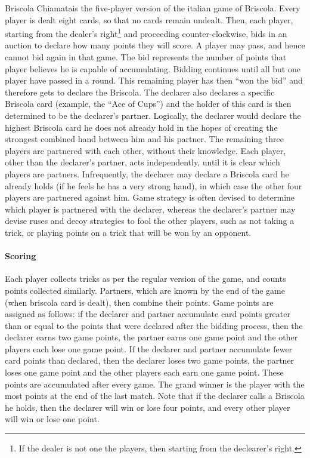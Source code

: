 \documentclass[a4paper]{article}
\begin{document}
Briscola Chiamatais the five-player version of the italian game of Briscola\cite{wiki:briscola}. Every player is dealt eight cards, so that no cards remain undealt. Then, each player, starting from the dealer's right\footnote{If the dealer is not one the players, then starting from the declearer's right.} and proceeding counter-clockwise, bids in an auction to declare how many points they will score. A player may pass, and hence cannot bid again in that game. The bid represents the number of points that player believes he is capable of accumulating. Bidding continues until all but one player have passed in a round. This remaining player has then ``won the bid'' and therefore gets to declare the Briscola. The declarer also declares a specific Briscola card (example, the ``Ace of Cups'') and the holder of this card is then determined to be the declarer's partner. Logically, the declarer would declare the highest Briscola card he does not already hold in the hopes of creating the strongest combined hand between him and his partner.
The remaining three players are partnered with each other, without their knowledge. Each player, other than the declarer's partner, acts independently, until it is clear which players are partners. Infrequently, the declarer may declare a Briscola card he already holds (if he feels he has a very strong hand), in which case the other four players are partnered against him.
Game strategy is often devised to determine which player is partnered with the declarer, whereas the declarer's partner may devise ruses and decoy strategies to fool the other players, such as not taking a trick, or playing points on a trick that will be won by an opponent.

\paragraph{Scoring}

Each player collects tricks as per the regular version of the game, and counts points collected similarly. Partners, which are known by the end of the game (when briscola card is dealt), then combine their points. Game points are assigned as follows: if the declarer and partner accumulate card points greater than or equal to the points that were declared after the bidding process, then the declarer earns two game points, the partner earns one game point and the other players each lose one game point. If the declarer and partner accumulate fewer card points than declared, then  the declarer loses two game points, the partner loses one game point and the other players each earn one game point. These points are accumulated after every game. The grand winner is the player with the most points at the end of the last match. Note that if the declarer calls a Briscola he holds, then the declarer will win or lose four points, and every other player will win or lose one point.
\end{document}
